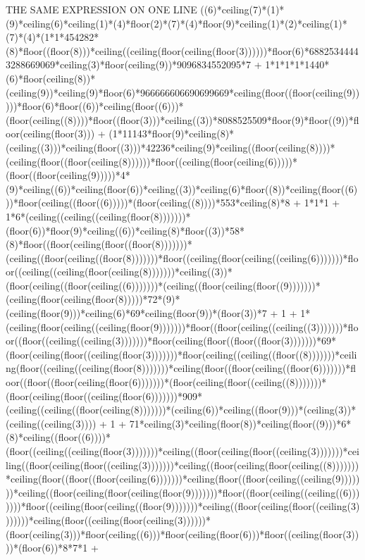 THE SAME EXPRESSION ON ONE LINE
((6)*ceiling(7)*(1)*(9)*ceiling(6)*ceiling(1)*(4)*floor(2)*(7)*(4)*floor(9)*ceiling(1)*(2)*ceiling(1)*(7)*(4)*(1*1*454282*(8)*floor((floor(8)))*ceiling((ceiling(floor(ceiling(floor(3))))))*floor(6)*68825344443288669069*ceiling(3)*floor(ceiling(9))*9096834552095*7 + 1*1*1*1*1440*(6)*floor(ceiling(8))*(ceiling(9))*ceiling(9)*floor(6)*966666606690699669*ceiling(floor((floor(ceiling(9)))))*floor(6)*floor((6))*ceiling(floor((6)))*(floor(ceiling((8))))*floor((floor(3)))*ceiling((3))*8088525509*floor(9)*floor((9))*floor(ceiling(floor(3))) + (1*11143*floor(9)*ceiling(8)*(ceiling((3)))*ceiling(floor((3)))*42236*ceiling(9)*ceiling((floor(ceiling(8))))*(ceiling(floor((floor(ceiling(8))))))*floor((ceiling(floor(ceiling(6)))))*(floor((floor(ceiling(9)))))*4*(9)*ceiling((6))*ceiling(floor(6))*ceiling((3))*ceiling(6)*floor((8))*ceiling(floor((6)))*floor(ceiling((floor((6)))))*(floor(ceiling((8))))*553*ceiling(8)*8 + 1*1*1 + 1*6*(ceiling((ceiling((ceiling(floor(8)))))))*(floor(6))*floor(9)*ceiling((6))*ceiling(8)*floor((3))*58*(8)*floor((floor(ceiling(floor((floor(8)))))))*(ceiling((floor(ceiling((floor(8)))))))*floor((ceiling(floor(ceiling((ceiling(6)))))))*floor((ceiling((ceiling(floor(ceiling(8)))))))*ceiling((3))*(floor(ceiling((floor(ceiling((6)))))))*(ceiling((floor(ceiling(floor((9)))))))*(ceiling(floor(ceiling(floor(8)))))*72*(9)*(ceiling(floor(9)))*ceiling(6)*69*ceiling(floor(9))*(floor(3))*7 + 1 + 1*(ceiling(floor(ceiling((ceiling(floor(9)))))))*floor((floor(ceiling((ceiling((3)))))))*floor((floor((ceiling((ceiling(3)))))))*floor(ceiling(floor((floor((floor(3)))))))*69*(floor(ceiling(floor((ceiling(floor(3)))))))*floor(ceiling((ceiling((floor((8)))))))*ceiling(floor((ceiling((ceiling(floor(8)))))))*ceiling(floor((floor(ceiling((floor(6)))))))*floor((floor((floor(ceiling(floor(6)))))))*(floor(ceiling(floor((ceiling((8)))))))*(floor(ceiling(floor((ceiling(floor(6)))))))*909*(ceiling((ceiling((floor(ceiling(8)))))))*(ceiling(6))*ceiling((floor(9)))*(ceiling(3))*(ceiling((ceiling(3)))) + 1 + 71*ceiling(3)*ceiling(floor(8))*ceiling(floor((9)))*6*(8)*ceiling((floor((6))))*(floor((ceiling((ceiling(floor(3)))))))*ceiling((floor(ceiling(floor((ceiling(3)))))))*ceiling((floor(ceiling(floor((ceiling(3)))))))*ceiling((floor(ceiling(floor(ceiling((8)))))))*ceiling(floor((floor((floor(ceiling(6)))))))*ceiling(floor((floor(ceiling((ceiling(9)))))))*ceiling((floor(ceiling(floor(ceiling(floor(9)))))))*floor((floor(ceiling((ceiling((6)))))))*floor((ceiling(floor(ceiling((floor(9)))))))*ceiling((floor(ceiling(floor((ceiling(3)))))))*ceiling(floor((ceiling(floor(ceiling(3))))))*(floor(ceiling(3)))*floor(ceiling((6)))*floor(ceiling(floor(6)))*floor((ceiling(floor(3))))*(floor(6))*8*7*1 + 